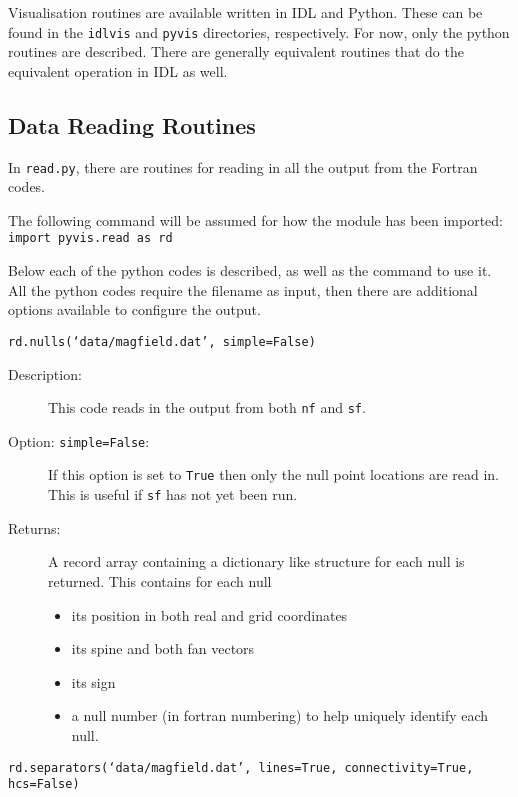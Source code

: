 \documentclass[12pt]{article}
\begin{document}
    Visualisation routines are available written in IDL and Python. These can be found in the \texttt{idlvis} and \texttt{pyvis} directories, respectively. For now, only the python routines are described. There are generally equivalent routines that do the equivalent operation in IDL as well.

    \subsection{Data Reading Routines}

      In \texttt{read.py}, there are routines for reading in all the output from the Fortran codes.

      The following command will be assumed for how the module has been imported:
      \texttt{import pyvis.read as rd}

      Below each of the python codes is described, as well as the command to use it. All the python codes require the filename as input, then there are additional options available to configure the output.

      \texttt{rd.nulls(`data/magfield.dat', simple=False)}

      \begin{description}
        \item [Description:] This code reads in the output from both \texttt{nf} and \texttt{sf}.
        \item [Option: \texttt{simple=False}:] If this option is set to \texttt{True} then only the null point locations are read in. This is useful if \texttt{sf} has not yet been run.
        \item [Returns:] A record array containing a dictionary like structure for each null is returned. This contains for each null
        \begin{itemize}
          \item its position in both real and grid coordinates
          \item its spine and both fan vectors
          \item its sign
          \item a null number (in fortran numbering) to help uniquely identify each null.
        \end{itemize}
      \end{description}

      \texttt{rd.separators(`data/magfield.dat', lines=True, connectivity=True, hcs=False)}
\end{document}
